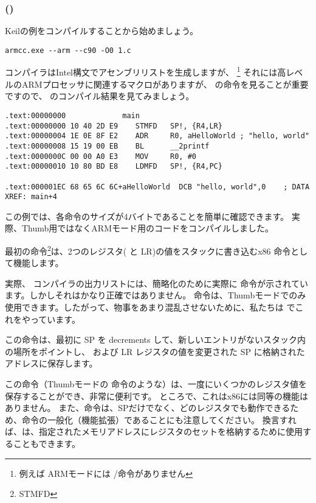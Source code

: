\subsubsection{\NonOptimizingKeilVI (\ARMMode)}

Keilの例をコンパイルすることから始めましょう。

\begin{lstlisting}
armcc.exe --arm --c90 -O0 1.c 
\end{lstlisting}

\myindex{\IntelSyntax}
コンパイラはIntel構文でアセンブリリストを生成しますが、
\footnote{例えば ARMモードには \PUSH/\POP 命令がありません}
それには高レベルのARMプロセッサに関連するマクロがありますが、 の命令を見ることが重要ですので、 \IDA のコンパイル結果を見てみましょう。

\begin{lstlisting}[caption=\NonOptimizingKeilVI (\ARMMode) \IDA,style=customasmARM]
.text:00000000             main
.text:00000000 10 40 2D E9    STMFD   SP!, {R4,LR}
.text:00000004 1E 0E 8F E2    ADR     R0, aHelloWorld ; "hello, world"
.text:00000008 15 19 00 EB    BL      __2printf
.text:0000000C 00 00 A0 E3    MOV     R0, #0
.text:00000010 10 80 BD E8    LDMFD   SP!, {R4,PC}

.text:000001EC 68 65 6C 6C+aHelloWorld  DCB "hello, world",0    ; DATA XREF: main+4
\end{lstlisting}

この例では、各命令のサイズが4バイトであることを簡単に確認できます。
実際、Thumb用ではなくARMモード用のコードをコンパイルしました。

最初の命令\footnote{\ac{STMFD}}は、2つのレジスタ( と \ac{LR})の値をスタックに書き込むx86 \PUSH 命令として機能します。

実際、  コンパイラの出力リストには、簡略化のために実際に  命令が示されています。しかしそれはかなり正確ではありません。 \PUSH 命令は、Thumbモードでのみ使用できます。したがって、物事をあまり混乱させないために、私たちは \IDA でこれをやっています。

この命令は、最初に \ac{SP} を \glspl{decrement} して、新しいエントリがないスタック内の場所をポイントし、  および \ac{LR} レジスタの値を変更された \ac{SP} に格納されたアドレスに保存します。

この命令（Thumbモードの \PUSH 命令のような）は、一度にいくつかのレジスタ値を保存することができ、非常に便利です。
ところで、これはx86には同等の機能はありません。
また、命令は、\ac{SP}だけでなく、どのレジスタでも動作できるため、\PUSH 命令の一般化（機能拡張）であることにも注意してください。
換言すれば、は、指定されたメモリアドレスにレジスタのセットを格納するために使用することもできます。

